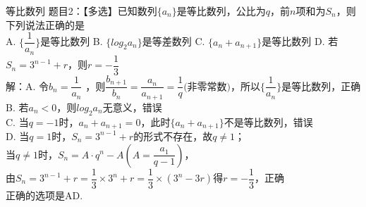 \documentclass[aspectratio=169]{ctexbeamer} %
\date{\today}
\begin{document}
\begin{frame}[t]{等比数列}
题目2：【多选】已知数列$\{a_n\}$是等比数列，公比为$q$，前$n$项和为$S_n$，则下列说法正确的是 \\
A. $\{ \dfrac{1}{a_n} \}$是等比数列    B. $\{  log_{2}a_n \}$是等差数列    C. $\{ a_n+a_{n+1} \}$是等比数列  D. 若$S_n = 3^{n-1} + r$，则$r = -\dfrac{1}{3}$  \\
\vspace{0.5cm}
\pause
解：A. 令$b_n = \dfrac{1}{a_n}$ ，则$\dfrac{b_{n+1}}{b_n} = \dfrac{a_n}{a_{n+1}} = \dfrac{1}{q} \text{(非零常数)} $，所以$\{ \dfrac{1}{a_n} \}$是等比数列，正确\\
\pause
B. 若$a_n < 0$，则$log_2a_n$无意义，错误\\
\pause
C. 当$q = -1$时，$a_n + a_{n+1} = 0$，此时$\{  a_n + a_{n+1} \}$不是等比数列，错误\\
\pause
D. 当$q = 1$时，$S_n = 3^{n-1} + r$的形式不存在，故$q \neq 1$；\\
当$q \neq 1$时，$S_n = A \cdot q^n - A(A = \dfrac{a_1}{q-1})$，\\
由$S_n = 3^{n-1} + r = \dfrac{1}{3} \times 3^n + r = \dfrac{1}{3} \times (3^n - 3r)$得$r = -\dfrac{1}{3}$，正确\\
\pause
正确的选项是AD.
\end{frame}
\end{document}
